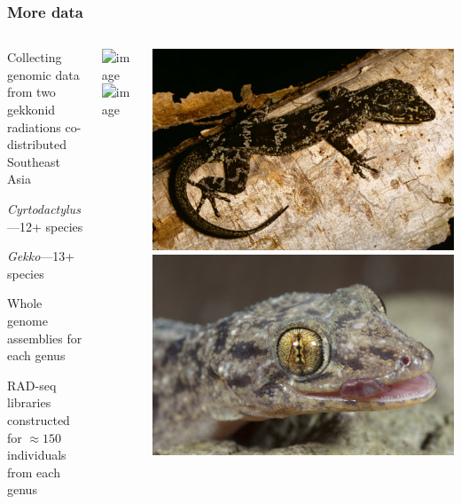 \begin{frame}
    \frametitle{More data}
    \begin{columns}[c]
        \begin{myitemize}
            \item Collecting genomic data from two gekkonid radiations
                co-distributed Southeast Asia
            \begin{myitemize}
                \item \emph{Cyrtodactylus}---12+ species
                \item \emph{Gekko}---13+ species
            \end{myitemize}
            \item Whole genome assemblies for each genus
            \item RAD-seq libraries constructed for $\approx150$ individuals
                from each genus
        \end{myitemize}
        \centerline{
        \includegraphics<1->[height=2.5cm]{/home/jamie/Dropbox/field-photos/misc/lee-and-me.jpg}
        \hspace{2mm}
        \includegraphics<1->[height=2.5cm]{/home/jamie/Dropbox/field-photos/people/rafe.jpg}}
        \includegraphics[width=\textwidth]{../images/photos/cyrt-agusanensis.jpg} \quad
        \includegraphics[width=\textwidth]{../images/photos/gekko-mindorensis.jpg}
    \end{columns}
\end{frame}

